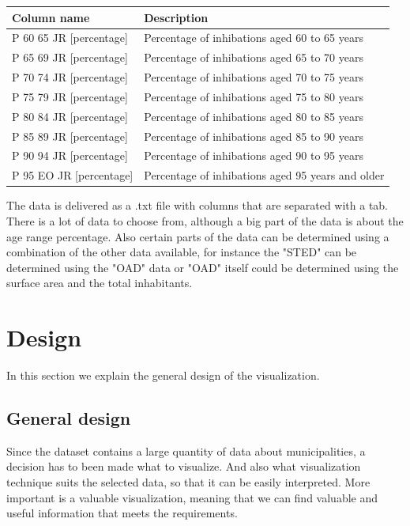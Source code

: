 \documentclass[a4paper,twoside,11pt]{article}
\begin{document}
\begin{center}
    \begin{tabular}{ | p{4.9cm} | p{10cm} |}
        \hline
        \textbf{Column name} & \textbf{Description} \\ \hline
        P 60 65 JR [percentage] & Percentage of inhibations aged 60 to 65 years \\ \hline
        P 65 69 JR [percentage] & Percentage of inhibations aged 65 to 70 years \\ \hline
        P 70 74 JR [percentage] & Percentage of inhibations aged 70 to 75 years \\ \hline
        P 75 79 JR [percentage] & Percentage of inhibations aged 75 to 80 years \\ \hline
        P 80 84 JR [percentage] & Percentage of inhibations aged 80 to 85 years \\ \hline
        P 85 89 JR [percentage] & Percentage of inhibations aged 85 to 90 years \\ \hline
        P 90 94 JR [percentage] & Percentage of inhibations aged 90 to 95 years \\ \hline
        P 95 EO JR [percentage] & Percentage of inhibations aged 95 years and older \\ \hline
    \end{tabular}
\end{center}
The data is delivered as a .txt file with columns that are separated with a tab. There is a lot of data to choose from, although a big part of the data is about the age range percentage. Also certain parts of the data can be determined using a combination of the other data available, for instance the "STED" can be determined using the "OAD" data or "OAD" itself could be determined using the surface area and the total inhabitants.
\newpage
\section{Design}
In this section we explain the general design of the visualization.

\subsection{General design}
Since the dataset contains a large quantity of data about municipalities, a decision has to been made what to visualize. And also what visualization technique suits the selected data, so that it can be easily interpreted. More important is a valuable visualization, meaning that we can find valuable and useful information that meets the requirements.
\end{document}
